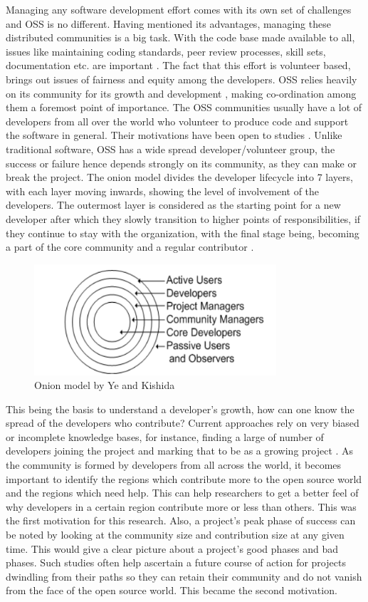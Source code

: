 \documentclass[seploa]{beavtex}
\begin{document}
Managing any software development effort comes with its own set of challenges and OSS is no different. Having mentioned its advantages, managing these distributed communities is a big task. With the code base made available to all, issues like maintaining coding standards, peer review processes, skill sets, documentation etc. are important \cite{tum2005}. The fact that this effort is volunteer based, brings out issues of fairness and equity among the developers. OSS relies heavily on its community for its growth and development \cite{seth2010}, making co-ordination among them a foremost point of importance. The OSS communities usually have a lot of developers from all over the world who volunteer to produce code and support the software in general. Their motivations have been open to studies \cite{greg2002}. Unlike traditional software, OSS has a wide spread developer/volunteer group, the success or failure hence depends strongly on its community, as they can make or break the project. The onion model divides the developer lifecycle into 7 layers, with each layer moving inwards, showing the level of involvement of the developers. The outermost layer is considered as the starting point for a new developer after which they slowly transition to higher points of responsibilities, if they continue to stay with the organization, with the final stage being, becoming a part of the core community and a regular contributor \cite{kishida2003}.

\begin{figure}[H]
\centering
\includegraphics[width=90mm]{onion.png}
\caption{Onion model by Ye and Kishida}
\end{figure}

This being the basis to understand a developer's growth, how can one know the spread of the developers who contribute? Current approaches rely on very biased or incomplete knowledge bases, for instance, finding a large of number of developers joining the project and marking that to be as a growing project \cite{igor2014}. As the community is formed by developers from all across the world, it becomes important to identify the regions which contribute more to the open source world and the regions which need help. This can help researchers to get a better feel of why developers in a certain region contribute more or less than others. This was the first motivation for this research. Also, a project's peak phase of success can be noted by looking at the community size and contribution size at any given time. This would give a clear picture about a project's good phases and bad phases. Such studies often help ascertain a future course of action for projects dwindling from their paths so they can retain their community and do not vanish from the face of the open source world. This became the second motivation.
\end{document}
